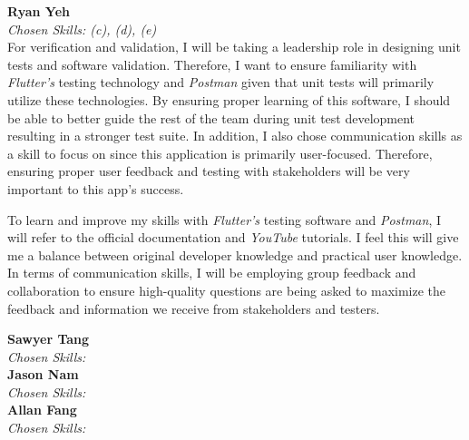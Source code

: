 \documentclass[12pt, titlepage]{article}
\begin{document}
\begin{enumerate}
  \textbf{Ryan Yeh}\\
  \textit{Chosen Skills: (c), (d), (e)} \\
  For verification and validation, I will be taking a leadership role in designing unit tests and software
  validation. Therefore, I want to ensure familiarity with \textit{Flutter's} testing technology and \textit{Postman}
  given that unit tests will primarily utilize these technologies. By ensuring proper learning of
  this software, I should be able to better guide the rest of the team during unit test development resulting
  in a stronger test suite. In addition, I also chose communication skills as a skill to focus on since this application
  is primarily user-focused. Therefore, ensuring proper user feedback and testing with stakeholders will be very important
  to this app's success. \par
  To learn and improve my skills with \textit{Flutter's} testing software and \textit{Postman}, I will refer to the
  official documentation and \textit{YouTube} tutorials. I feel this will give me a balance between original developer
  knowledge and practical user knowledge. In terms of communication skills, I will be employing group feedback
  and collaboration to ensure high-quality questions are being asked to maximize the feedback and information we receive
  from stakeholders and testers.

  \medskip
  \textbf{Sawyer Tang}\\
  \textit{Chosen Skills: } \\

  \medskip
  \textbf{Jason Nam}\\
  \textit{Chosen Skills: }\\

  \medskip
  \textbf{Allan Fang}\\
  \textit{Chosen Skills: } \\
\end{enumerate}
\end{document}
